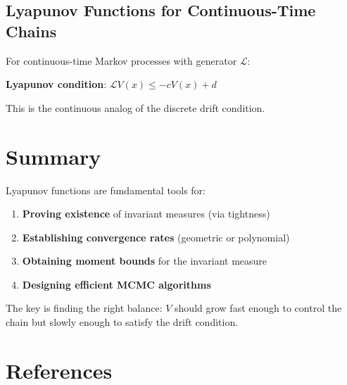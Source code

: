 \documentclass{amsart}
\theoremstyle{plain}
\theoremstyle{definition}
\theoremstyle{remark}
\begin{document}
\subsection{Lyapunov Functions for Continuous-Time Chains}

For continuous-time Markov processes with generator $\mathcal{L}$:

\textbf{Lyapunov condition}: $\mathcal{L}V(x) \leq -c V(x) + d$

This is the continuous analog of the discrete drift condition.

\section{Summary}

Lyapunov functions are fundamental tools for:

\begin{enumerate}
	\item \textbf{Proving existence} of invariant measures (via tightness)
	\item \textbf{Establishing convergence rates} (geometric or polynomial)
	\item \textbf{Obtaining moment bounds} for the invariant measure
	\item \textbf{Designing efficient MCMC algorithms}
\end{enumerate}

The key is finding the right balance: $V$ should grow fast enough to control the chain but slowly enough to satisfy the drift condition.

\section{References}
\end{document}
